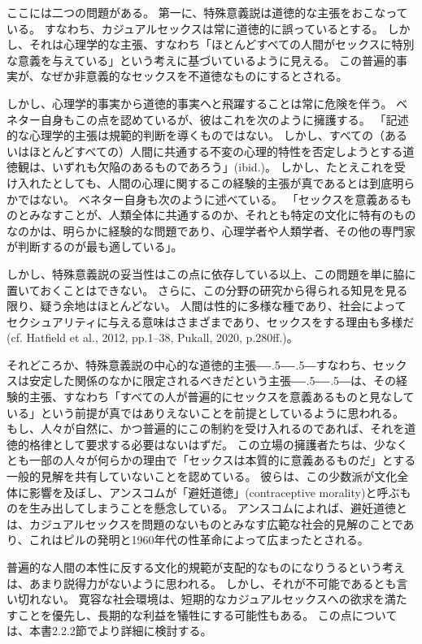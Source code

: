 \documentclass[paper=a4,book,openany]{jlreq}
\def\DDASH{―\kern-.5\zw―\kern-.5\zw―}
\begin{document}
ここには二つの問題がある。
第一に、特殊意義説は道徳的な主張をおこなっている。
すなわち、カジュアルセックスは常に道徳的に誤っているとする。
しかし、それは心理学的な主張、すなわち「ほとんどすべての人間がセックスに特別な意義を与えている」という考えに基づいているように見える。
この普遍的事実が、なぜか非意義的なセックスを不道徳なものにするとされる。

しかし、心理学的事実から道徳的事実へと飛躍することは常に危険を伴う。
ベネター自身もこの点を認めているが、彼はこれを次のように擁護する。
「記述的な心理学的主張は規範的判断を導くものではない。
しかし、すべての（あるいはほとんどすべての）人間に共通する不変の心理的特性を否定しようとする道徳観は、いずれも欠陥のあるものであろう」(ibid.)。
しかし、たとえこれを受け入れたとしても、人間の心理に関するこの経験的主張が真であるとは到底明らかではない。
ベネター自身も次のように述べている。
「セックスを意義あるものとみなすことが、人類全体に共通するのか、それとも特定の文化に特有のものなのかは、明らかに経験的な問題であり、心理学者や人類学者、その他の専門家が判断するのが最も適している」\citep[p.198]{benatar02:_two_views_sexual_ethic}。

しかし、特殊意義説の妥当性はこの点に依存している以上、この問題を単に脇に置いておくことはできない。
さらに、この分野の研究から得られる知見を見る限り、疑う余地はほとんどない。
人間は性的に多様な種であり、社会によってセクシュアリティに与える意味はさまざまであり、セックスをする理由も多様だ(cf. Hatfield et al., 2012, pp.1--38, Pukall, 2020, p.280ff.)\nocite{hatfield12:_cultur_social_gender}\nocite{pukall20:_human_sexual}。

それどころか、特殊意義説の中心的な道徳的主張{\DDASH}すなわち、セックスは安定した関係のなかに限定されるべきだという主張{\DDASH}は、その経験的主張、すなわち「すべての人が普遍的にセックスを意義あるものと見なしている」という前提が真ではありえないことを前提としているように思われる。
もし、人々が自然に、かつ普遍的にこの制約を受け入れるのであれば、それを道徳的格律として要求する必要はないはずだ。
この立場の擁護者たちは、少なくとも一部の人々が何らかの理由で「セックスは本質的に意義あるものだ」とする一般的見解を共有していないことを認めている。
彼らは、この少数派が文化全体に影響を及ぼし、アンスコムが「避妊道徳」(contraceptive morality)と呼ぶものを生み出してしまうことを懸念している。
アンスコムによれば、避妊道徳とは、カジュアルセックスを問題のないものとみなす広範な社会的見解のことであり、これはピルの発明と1960年代の性革命によって広まったとされる。

普遍的な人間の本性に反する文化的規範が支配的なものになりうるという考えは、あまり説得力がないように思われる。
しかし、それが不可能であるとも言い切れない。
寛容な社会環境は、短期的なカジュアルセックスへの欲求を満たすことを優先し、長期的な利益を犠牲にする可能性もある。
この点については、本書2.2.2節でより詳細に検討する。
\end{document}
